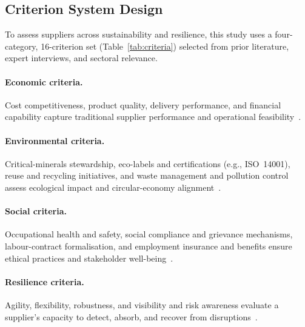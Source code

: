 \documentclass[preprint,12pt]{elsarticle}
\begin{document}
\subsection{Criterion System Design}
To assess suppliers across sustainability and resilience, this study uses a four-category, 16-criterion set (Table~\ref{tab:criteria}) selected from prior literature, expert interviews, and sectoral relevance.

\paragraph{Economic criteria.}
Cost competitiveness, product quality, delivery performance, and financial capability capture traditional supplier performance and operational feasibility~\citep{Afrasiabi_Tavana_DiCaprio_2022,christopher_peck_2004_resilient_sc}.

\paragraph{Environmental criteria.}
Critical-minerals stewardship, eco-labels and certifications (e.g., ISO~14001), reuse and recycling initiatives, and waste management and pollution control assess ecological impact and circular-economy alignment~\citep{Varchandi_Memari_AkbariJokar_2024,testa_etal_2012_gscm_drivers}.

\paragraph{Social criteria.}
Occupational health and safety, social compliance and grievance mechanisms, labour-contract formalisation, and employment insurance and benefits ensure ethical practices and stakeholder well-being~\citep{gualandris_kalchschmidt_2016_sustainability_trust,El_Bettioui_Zaim_Sbihi_2023}.

\paragraph{Resilience criteria.}
Agility, flexibility, robustness, and visibility and risk awareness evaluate a supplier's capacity to detect, absorb, and recover from disruptions~\citep{soni_etal_2014_sc_resilience,pettit_etal_2010_scr_framework,brandonjones_etal_2014_scr_robustness,Ivanov_Dolgui_2021}.
\end{document}
